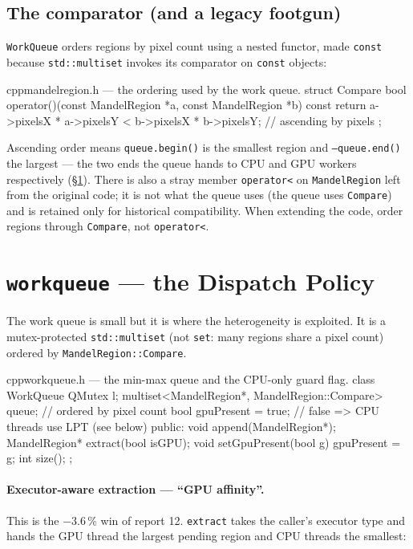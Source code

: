 \documentclass[
	english,
	letterpaper, oneside
]{article}
\begin{document}
\subsection{The comparator (and a legacy footgun)}

\texttt{WorkQueue} orders regions by pixel count using a nested functor, made
\texttt{const} because \texttt{std::multiset} invokes its comparator on
\texttt{const} objects:

\begin{sourcecode}{cpp}{mandelregion.h --- the ordering used by the work queue.}
struct Compare {
  bool operator()(const MandelRegion *a, const MandelRegion *b) const {
    return a->pixelsX * a->pixelsY < b->pixelsX * b->pixelsY;   // ascending by pixels
  }
};
\end{sourcecode}

Ascending order means \texttt{queue.begin()} is the smallest region and
\texttt{--queue.end()} the largest --- the two ends the queue hands to CPU and GPU
workers respectively (\S\ref{sec:queue}). There is also a stray member
\texttt{operator<} on \texttt{MandelRegion} left from the original code; it is
not what the queue uses (the queue uses \texttt{Compare}) and is retained
only for historical compatibility. When extending the code, order regions through
\texttt{Compare}, not \texttt{operator<}.

\section{\texttt{workqueue} --- the Dispatch Policy}
\label{sec:queue}

The work queue is small but it is where the heterogeneity is exploited. It is a
mutex-protected \texttt{std::multiset} (not \texttt{set}: many regions share a
pixel count) ordered by \texttt{MandelRegion::Compare}.

\begin{sourcecode}{cpp}{workqueue.h --- the min-max queue and the CPU-only guard flag.}
class WorkQueue {
  QMutex l;
  multiset<MandelRegion*, MandelRegion::Compare> queue;  // ordered by pixel count
  bool gpuPresent = true;             // false => CPU threads use LPT (see below)
public:
  void append(MandelRegion*);
  MandelRegion* extract(bool isGPU);
  void setGpuPresent(bool g) { gpuPresent = g; }
  int size();
};
\end{sourcecode}

\paragraph{Executor-aware extraction --- ``GPU affinity''.} This is the −3.6\,\%
win of report 12. \texttt{extract} takes the caller's executor type and hands the
GPU thread the largest pending region and CPU threads the smallest:
\end{document}
